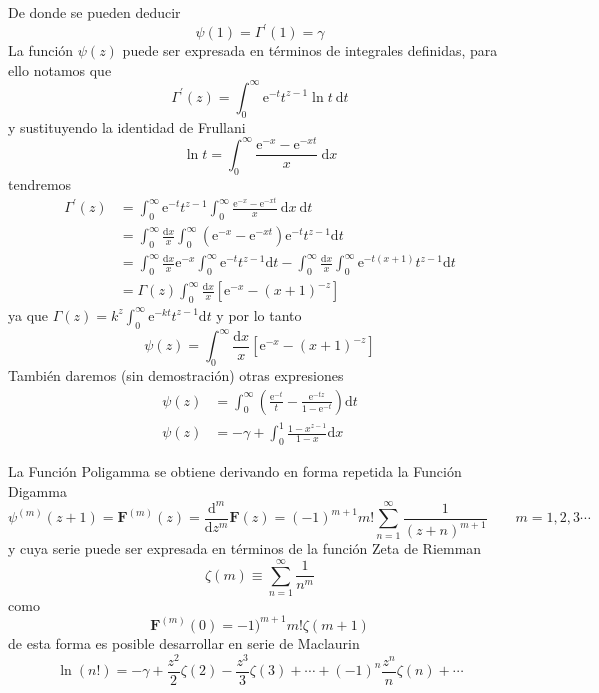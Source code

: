 \documentclass[spanish,notitlepage,letterpaper,12pt]{article}
\begin{document}
De donde se pueden deducir
\[
\psi(1)=\Gamma^{\prime}\left(  1\right)  =\gamma
\]
La funci\'{o}n $\psi(z)$ puede ser expresada en t\'{e}rminos de integrales
definidas, para ello notamos que
\[
\Gamma^{\prime}\left(  z\right)  =\int_{0}^{\infty}\mathrm{e}^{-t}t^{z-1}\ln
t\ \mathrm{d}t
\]
y sustituyendo la identidad de Frullani
\[
\ln t=\int_{0}^{\infty}\frac{\mathrm{e}^{-x}-\mathrm{e}^{-xt}}x\ \mathrm{d}x
\]
tendremos
\begin{align*}
\Gamma^{\prime}\left(  z\right)   & =\int_{0}^{\infty}\mathrm{e}^{-t}%
t^{z-1}\int_{0}^{\infty}\frac{\mathrm{e}^{-x}-\mathrm{e}^{-xt}}x\ \mathrm{d}%
x\ \mathrm{d}t\\
& =\int_{0}^{\infty}\frac{\mathrm{d}x}x\int_{0}^{\infty}\left(  \mathrm{e}%
^{-x}-\mathrm{e}^{-xt}\right)  \mathrm{e}^{-t}t^{z-1}\mathrm{d}t\\
& =\int_{0}^{\infty}\frac{\mathrm{d}x}x\mathrm{e}^{-x}\int_{0}^{\infty
}\mathrm{e}^{-t}t^{z-1}\mathrm{d}t-\int_{0}^{\infty}\frac{\mathrm{d}x}%
x\int_{0}^{\infty}\mathrm{e}^{-t\left(  x+1\right)  }t^{z-1}\mathrm{d}t\\
& =\Gamma\left(  z\right)  \int_{0}^{\infty}\frac{\mathrm{d}x}x\left[
\mathrm{e}^{-x}-\left(  x+1\right)  ^{-z}\right]
\end{align*}
ya que $\Gamma\left(  z\right)  =k^{z}\int_{0}^{\infty}\mathrm{e}^{-kt}%
t^{z-1}\mathrm{d}t $ y por lo tanto
\[
\psi(z)=\int_{0}^{\infty}\frac{\mathrm{d}x}x\left[  \mathrm{e}^{-x}-\left(
x+1\right)  ^{-z}\right]
\]
Tambi\'{e}n daremos (sin demostraci\'{o}n) otras expresiones
\begin{align*}
\psi(z)  & =\int_{0}^{\infty}\left(  \frac{\mathrm{e}^{-t}}t-\frac
{\mathrm{e}^{-tz}}{1-\mathrm{e}^{-t}}\right)  \mathrm{d}t\\
\psi(z)  & =-\gamma+\int_{0}^{1}\frac{1-x^{z-1}}{1-x}\mathrm{d}x
\end{align*}

La Funci\'{o}n Poligamma se obtiene derivando en forma repetida la Funci\'{o}n
Digamma
\[
\psi^{(m)}(z+1)=\mathbf{F}^{(m)}(z)=\frac{\mathrm{d}^{m}}{\mathrm{d}z^{m}%
}\mathbf{F}(z)=(-1)^{m+1}m!\sum_{n=1}^{\infty}\frac1{\left(  z+n\right)
^{m+1}}\qquad m=1,2,3\cdots
\]
y cuya serie puede ser expresada en t\'{e}rminos de la funci\'{o}n Zeta de
Riemman
\[
\zeta(m)\equiv\sum_{n=1}^{\infty}\frac1{n^{m}}
\]
como
\[
\mathbf{F}^{(m)}(0)=-1)^{m+1}m!\zeta(m+1)
\]
de esta forma es posible desarrollar en serie de Maclaurin
\[
\ln(n!)=-\gamma+\frac{z^{2}}2\zeta(2)-\frac{z^{3}}3\zeta(3)+\cdots+\left(
-1\right)  ^{n}\frac{z^{n}}n\zeta(n)+\cdots
\]
\end{document}
